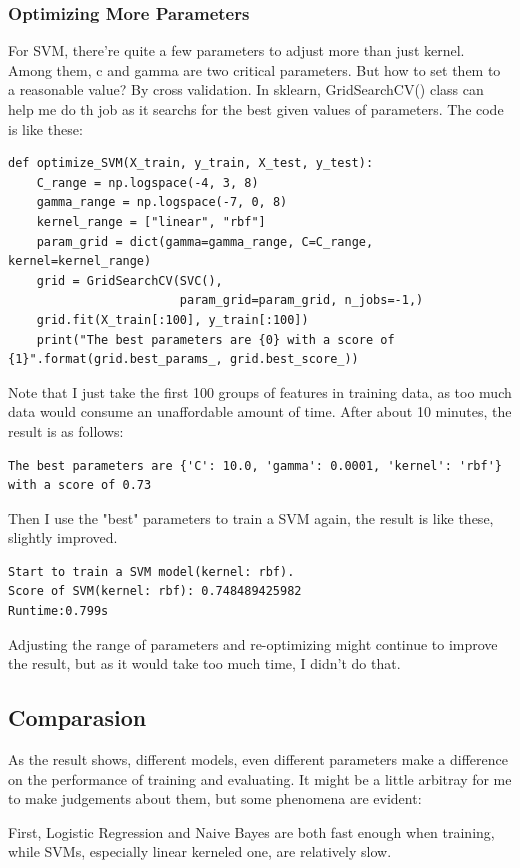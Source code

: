 \documentclass[a4paper]{article}
\begin{document}
            \subsubsection{Optimizing More Parameters}
For SVM, there're quite a few parameters to adjust more than just kernel. Among them, c and gamma are two critical parameters. But how to set them to a reasonable value? By cross validation. In sklearn, GridSearchCV() class can help me do th job as it searchs for the best given values of parameters. The code is like these:
\begin{verbatim}
def optimize_SVM(X_train, y_train, X_test, y_test):
    C_range = np.logspace(-4, 3, 8)
    gamma_range = np.logspace(-7, 0, 8)
    kernel_range = ["linear", "rbf"]
    param_grid = dict(gamma=gamma_range, C=C_range, kernel=kernel_range)
    grid = GridSearchCV(SVC(),
                        param_grid=param_grid, n_jobs=-1,)
    grid.fit(X_train[:100], y_train[:100])
    print("The best parameters are {0} with a score of {1}".format(grid.best_params_, grid.best_score_))
\end{verbatim}
Note that I just take the first 100 groups of features in training data, as too much data would consume an unaffordable amount of time. After about 10 minutes, the result is as follows:
\begin{verbatim}
The best parameters are {'C': 10.0, 'gamma': 0.0001, 'kernel': 'rbf'} with a score of 0.73
\end{verbatim}
Then I use the "best" parameters to train a SVM again, the result is like these, slightly improved.
\begin{verbatim}
Start to train a SVM model(kernel: rbf).
Score of SVM(kernel: rbf): 0.748489425982
Runtime:0.799s
\end{verbatim}
Adjusting the range of parameters and re-optimizing might continue to improve the result, but as it would take too much time, I didn't do that.
        \subsection{Comparasion}
As the result shows, different models, even different parameters make a difference on the performance of training and evaluating. It might be a little arbitray for me to make judgements about them, but some phenomena are evident:

First, Logistic Regression and Naive Bayes are both fast enough when training, while SVMs, especially linear kerneled one, are relatively slow.
\end{document}
